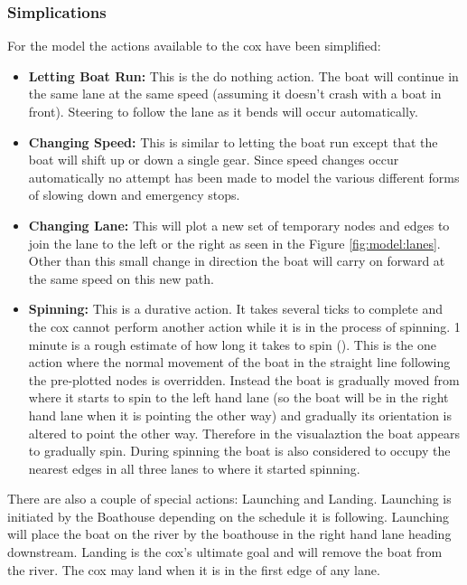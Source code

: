       \subsubsection{Simplications}
      For the model the actions available to the cox have been simplified:
      \begin{itemize}
        \item{\textbf{Letting Boat Run:}} This is the do nothing action. The boat will continue in the same lane at the same speed (assuming it doesn't crash with a boat in front). Steering to follow the lane as it bends will occur automatically.
        \item{\textbf{Changing Speed:}} This is similar to letting the boat run except that the boat will shift up or down a single gear. Since speed changes occur automatically no attempt has been made to model the various different forms of slowing down and emergency stops.
        \item{\textbf{Changing Lane:}} This will plot a new set of temporary nodes and edges to join the lane to the left or the right as seen in the Figure \ref{fig:model:lanes}. Other than this small change in direction the boat will carry on forward at the same speed on this new path.
        \item{\textbf{Spinning:}} This is a durative action. It takes several ticks to complete and the cox cannot perform another action while it is in the process of spinning. 1 minute is a rough estimate of how long it takes to spin (\cite{QCBC}). This is the one action where the normal movement of the boat in the straight line following the pre-plotted nodes  is overridden. Instead the boat is gradually moved from where it starts to spin to the left hand lane (so the boat will be in the right hand lane when it is pointing the other way) and gradually its orientation is altered to point the other way. Therefore in the visualaztion the boat appears to gradually spin. During spinning the boat is also considered to occupy the nearest edges in all three lanes to where it started spinning.
      \end{itemize}
      
      There are also a couple of special actions: Launching and Landing. Launching is initiated by the Boathouse depending on the schedule it is following. Launching will place the boat on the river by the boathouse in the right hand lane heading downstream. Landing is the cox's ultimate goal and will remove the boat from the river. The cox may land when it is in the first edge of any lane.
      
